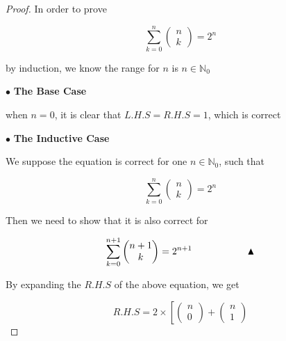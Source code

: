 \documentclass[12pt]{article}
\begin{document}
\begin{proof}

    In order to prove

    \[ \sum_{k=0}^{n} 
    \begin{pmatrix}
        n \\
        k
    \end{pmatrix} = 2^n \]

    \vspace*{0.3cm}
    \hspace*{1.2cm}
    by induction, we know the range for $n$ is $ n \in \mathbb{N}_{0} $

    \vspace*{0.3cm}
    $\bullet$ \textbf{The Base Case}

    \vspace*{0.3cm}
    \hspace*{1.2cm}
    when $n=0$, it is clear that $L.H.S = R.H.S = 1$, which is correct

    \vspace*{0.3cm}
    $\bullet$ \textbf{The Inductive Case}

    \vspace*{0.3cm}
    \hspace*{1.2cm}
    We suppose the equation is correct for one $ n \in \mathbb{N}_{0} $, such that

    \[ \sum_{k=0}^{n} 
    \begin{pmatrix}
        n \\
        k
    \end{pmatrix} = 2^n \]

    
    \vspace*{0.3cm}
    \hspace*{1.2cm}
    Then we need to show that it is also correct for

    \[ \sum_{k=0}^{n+1} 
    \begin{pmatrix}
        n + 1\\
        k
    \end{pmatrix} = 2^{n+1}  \hspace*{2cm} \blacktriangle\]

    \vspace*{0.3cm}
    \hspace*{1.2cm}
    By expanding the $R.H.S$ of the above equation, we get

    \[ R.H.S = 2 \times \left[ \begin{pmatrix}
                   n  \\
                   0
    \end{pmatrix}  + \begin{pmatrix}
                         n \\
                         1
                     

\end{pmatrix}\]
\end{proof}
\end{document}
